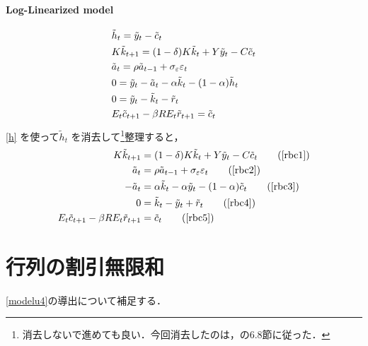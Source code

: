 \documentclass[a4j, dvipdfmx]{jarticle}
\begin{document}
\begin{appendix}
\paragraph{Log-Linearized model}
\begin{align}
&\tilde h_t = \tilde y_t - \tilde c_t\label{h}\\
&K \tilde k_{t+1} = (1-\delta) K \tilde k_t  + Y \tilde y_t - C \tilde c_t\notag\\
&\tilde a_t = \rho \tilde a_{t-1} + \sigma_\varepsilon \varepsilon_t\notag\\
&0 = \tilde y_t - \tilde a_t - \alpha \tilde k_t - (1-\alpha) \tilde h_t\notag\\
&0 = \tilde y_t - \tilde k_t - \tilde r_t\notag\\
&E_t\tilde c_{t+1} - \beta R E_t \tilde r_{t+1} = \tilde c_t\notag
\end{align}
\eqref{h} を使って$\tilde h_t$ を消去して\footnote{消去しないで進めても良い．今回消去したのは，\citet{mccan2008:abcs}の6.8節に従った．}整理すると，
\begin{align}
K \tilde k_{t+1} &= (1-\delta) K \tilde k_t  + Y \tilde y_t - C \tilde c_t\tag{\ref{rbc1}}\\
\tilde a_t &= \rho \tilde a_{t-1} + \sigma_\varepsilon \varepsilon_t\tag{\ref{rbc2}}\\
- \tilde a_t &= \alpha \tilde k_t -\alpha \tilde y_t - (1-\alpha) \tilde c_t\tag{\ref{rbc3}}\\
0 &= \tilde k_t - \tilde y_t + \tilde r_t\tag{\ref{rbc4}}\\
E_t\tilde c_{t+1} - \beta R E_t \tilde r_{t+1} &= \tilde c_t\tag{\ref{rbc5}}
\end{align}
\end{appendix}

\section{行列の割引無限和}
\eqref{modelu4}の導出について補足する．
\end{document}
